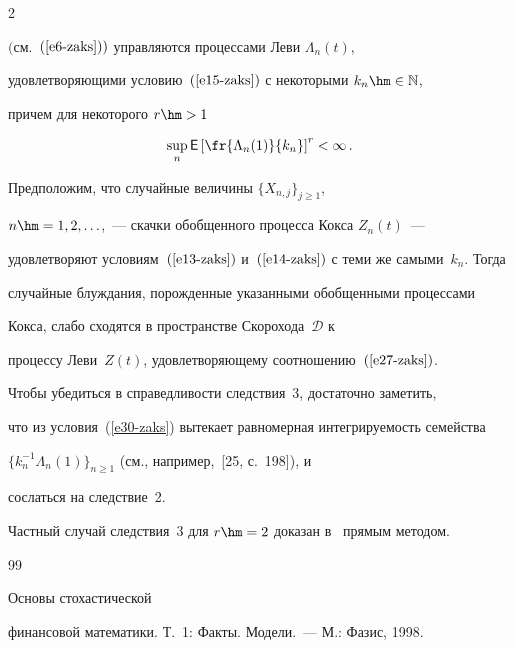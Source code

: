 \begin{multicols}{2}
{$($см.~$(\ref{e6-zaks}))$ управляются процессами Леви $\Lambda_n(t)$,

удовлетворяющими условию~$(\ref{e15-zaks})$ с некоторыми $k_n\hm\in\mathbb{N}$,

причем для некоторого $r\hm>1$

\begin{equation}

\sup_n{\sf E}\left[\fr{\Lambda_n(1)}{k_n}\right]^r<\infty\,.\label{e30-zaks}

\end{equation}

Предположим, что случайные величины $\{X_{n,j}\}_{j\geqslant1}$,

$n\hm=1,2,\ldots$,~--- скачки обобщенного процесса Кокса $Z_n(t)$~---

удовлетворяют условиям~$(\ref{e13-zaks})$ и~$(\ref{e14-zaks})$ с теми же самыми~$k_n$. Тогда

случайные блуждания, порожденные указанными обобщенными процессами

Кокса, слабо сходятся в пространстве Скорохода~$\mathcal{D}$ к

процессу Леви~$Z(t)$, удовлетворяющему соотношению~$(\ref{e27-zaks})$.}



\smallskip



Чтобы убедиться в справедливости следствия~3, достаточно заметить,

что из условия~(\ref{e30-zaks}) вытекает равномерная интегрируемость семейства

$\{k_n^{-1}\Lambda_n(1)\}_{n\geqslant1}$ (см., например,~[25, с.~198]), и

сослаться на следствие~2.



Частный случай следствия~3 для $r\hm=2$ доказан в~\cite{Kashcheev2000, Kashcheev2001} прямым методом.



{\small\frenchspacing

{%


\begin{thebibliography}{99}



  Основы стохастической

финансовой математики. Т.~1: Факты. Модели.~--- М.: Фазис, 1998.




\end{thebibliography}}}
\end{multicols}
